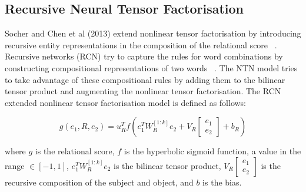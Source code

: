 \subsection{Recursive Neural Tensor Factorisation}
Socher and Chen et al (2013) extend nonlinear tensor factorisation by introducing recursive entity representations in the composition of the relational score ~\citep{socher2013reasoning}. Recursive networks (RCN) try to capture the rules for word combinations by constructing compositional representations of two words ~\citep{socher2012semantic}. The NTN model tries to take advantage of these compositional rules by adding them to the bilinear tensor product and augmenting the nonlinear tensor factorisation. The RCN extended nonlinear tensor factorisation model is defined as follows:

\begin{equation}
	g(e_1, R, e_2) =  u_R^Tf(e_1^TW_R^{\left [1:k\right ]}e_2 + V_R\left [ \begin{matrix} e_1 \\ e_2 \end{matrix} \right ] + b_R)
\end{equation}

where $g$ is the relational score, $f$ is the hyperbolic sigmoid function, a value in the range $\in \left [ -1, 1 \right ]$, $e_1^TW_R^{\left [1:k\right ]}e_2 $ is the bilinear tensor product, $V_R\left [ \begin{matrix} e_1 \\ e_2 \end{matrix} \right ]$ is the recursive composition of the subject and object, and $b$ is the bias.

